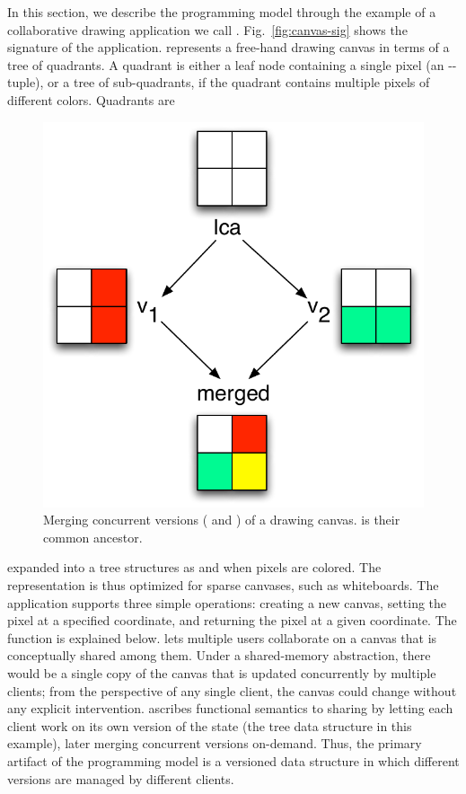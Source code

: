 In this section, we describe the \name programming model through the
example of a collaborative drawing application we call \drawsome.
Fig.~\ref{fig:canvas-sig} shows the signature of the \drawsome
application. \drawsome represents a free-hand drawing canvas in terms
of a tree of quadrants.  A quadrant is either a leaf node containing a
single pixel (an -- tuple), or a tree of sub-quadrants,
if the quadrant contains multiple pixels of different colors.
Quadrants are
\begin{figure}
\centering
\includegraphics[scale=0.43]{Figures/canvas-merging}
\caption{Merging concurrent versions ( and ) of a drawing
canvas.  is their common ancestor.}
\label{fig:canvas-merging}
\end{figure}
expanded into a tree structures as and when pixels are colored.  The
representation is thus optimized for sparse canvases, such as
whiteboards. The application supports three simple operations:
creating a new canvas, setting the pixel at a specified coordinate,
and returning the pixel at a given coordinate. The  function
is explained below.  \drawsome lets multiple users collaborate on a
canvas that is conceptually shared among them. Under a shared-memory
abstraction, there would be a single copy of the canvas that is
updated concurrently by multiple clients; from the perspective of any
single client, the canvas could change without any explicit
intervention. \name ascribes functional semantics to sharing by
letting each client work on its own version of the state (the tree
data structure in this example), later merging concurrent versions
on-demand.  Thus, the primary artifact of the \name programming model
is a versioned data structure in which different versions are managed
by different clients.

